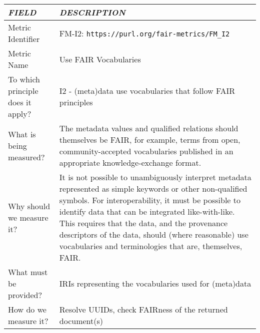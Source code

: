 \documentclass[english]{article}
\begin{document}
\begin{longtable}{|p{5cm}|p{9cm}|}


\hline
\emph{FIELD} & \emph{DESCRIPTION} \\
\hline
Metric Identifier &   FM-I2: \verb"https://purl.org/fair-metrics/FM_I2"
\\


\hline
Metric Name &   


Use FAIR Vocabularies


 \\



\hline
To which principle does it apply? &   




I2 - (meta)data use vocabularies that follow FAIR principles

\\



\hline
What is being measured? & 




The metadata values and qualified relations should themselves be FAIR, for example, terms from open, community-accepted vocabularies published in an appropriate knowledge-exchange format.


\\



\hline
Why should we measure it? & 





It is not possible to unambiguously interpret metadata represented as simple keywords or other non-qualified symbols.  For interoperability, it must be possible to identify data that can be integrated like-with-like.  This requires that the data, and the provenance descriptors of the data, should (where reasonable) use vocabularies and terminologies that are, themselves, FAIR.
  
\\



\hline
What must be provided? &  


IRIs representing the vocabularies used for (meta)data 


\\



\hline
How do we measure it? &  


Resolve UUIDs, check FAIRness of the returned document(s)



\end{longtable}
\end{document}

